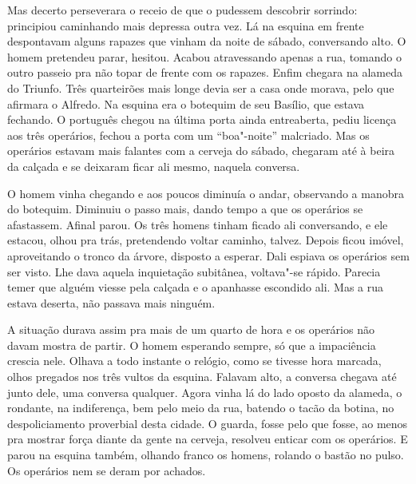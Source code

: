 Mas decerto perseverara o receio de que o pudessem descobrir sorrindo:
principiou caminhando mais depressa outra vez. Lá na esquina em frente
despontavam alguns rapazes que vinham da noite de sábado, conversando
alto. O homem pretendeu parar, hesitou. Acabou atravessando apenas a
rua, tomando o outro passeio pra não topar de frente com os rapazes.
Enfim chegara na alameda do Triunfo. Três quarteirões mais longe devia
ser a casa onde morava, pelo que afirmara o Alfredo. Na esquina era o
botequim de seu Basílio, que estava fechando. O português chegou na
última porta ainda entreaberta, pediu licença aos três operários, fechou
a porta com um ``boa"-noite'' malcriado. Mas os operários estavam mais
falantes com a cerveja do sábado, chegaram até à beira da calçada e se
deixaram ficar ali mesmo, naquela conversa.

O homem vinha chegando e aos poucos diminuía o andar, observando a
manobra do botequim. Diminuiu o passo mais, dando tempo a que os
operários se afastassem. Afinal parou. Os três homens tinham ficado ali
conversando, e ele estacou, olhou pra trás, pretendendo voltar caminho,
talvez. Depois ficou imóvel, aproveitando o tronco da árvore, disposto a
esperar. Dali espiava os operários sem ser visto. Lhe dava aquela
inquietação subitânea, voltava"-se rápido. Parecia temer que alguém
viesse pela calçada e o apanhasse escondido ali. Mas a rua estava
deserta, não passava mais ninguém.

A situação durava assim pra mais de um quarto de hora e os operários não
davam mostra de partir. O homem esperando sempre, só que a impaciência
crescia nele. Olhava a todo instante o relógio, como se tivesse hora
marcada, olhos pregados nos três vultos da esquina. Falavam alto, a
conversa chegava até junto dele, uma conversa qualquer. Agora vinha lá
do lado oposto da alameda, o rondante, na indiferença, bem pelo meio da
rua, batendo o tacão da botina, no despoliciamento proverbial desta
cidade. O guarda, fosse pelo que fosse, ao menos pra mostrar força
diante da gente na cerveja, resolveu enticar com os operários. E parou
na esquina também, olhando franco os homens, rolando o bastão no pulso.
Os operários nem se deram por achados.

